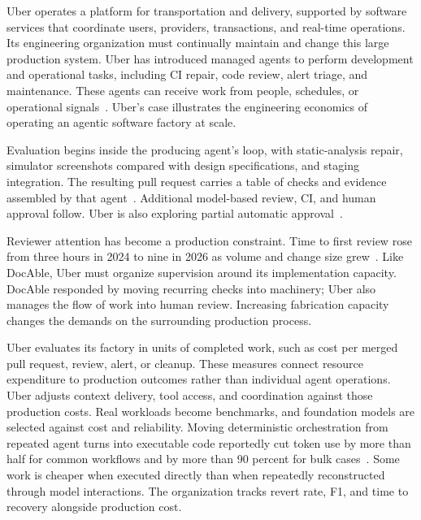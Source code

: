 Uber operates a platform for transportation and delivery, supported by software services that coordinate users, providers, transactions, and real-time operations. Its engineering organization must continually maintain and change this large production system. Uber has introduced managed agents to perform development and operational tasks, including CI repair, code review, alert triage, and maintenance. These agents can receive work from people, schedules, or operational signals~\citep{medisetty2026sdlc}. Uber's case illustrates the engineering economics of operating an agentic software factory at scale.


Evaluation begins inside the producing agent's loop, with static-analysis repair, simulator screenshots compared with design specifications, and staging integration. The resulting pull request carries a table of checks and evidence assembled by that agent~\citep{medisetty2026sdlc}. Additional model-based review, CI, and human approval follow. Uber is also exploring partial automatic approval~\citep{bond2026ureview}.


Reviewer attention has become a production constraint. Time to first review rose from three hours in 2024 to nine in 2026 as volume and change size grew~\citep{bond2026ureview}. Like DocAble, Uber must organize supervision around its implementation capacity. DocAble responded by moving recurring checks into machinery; Uber also manages the flow of work into human review. Increasing fabrication capacity changes the demands on the surrounding production process.


Uber evaluates its factory in units of completed work, such as cost per merged pull request, review, alert, or cleanup. These measures connect resource expenditure to production outcomes rather than individual agent operations. Uber adjusts context delivery, tool access, and coordination against those production costs. Real workloads become benchmarks, and foundation models are selected against cost and reliability. Moving deterministic orchestration from repeated agent turns into executable code reportedly cut token use by more than half for common workflows and by more than 90 percent for bulk cases~\citep{medisetty2026factory,medisetty2026sdlc}. Some work is cheaper when executed directly than when repeatedly reconstructed through model interactions. The organization tracks revert rate, F1, and time to recovery alongside production cost.

